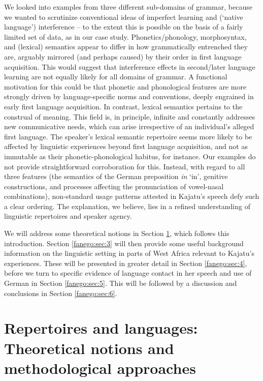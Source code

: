 \documentclass[output=paper]{langscibook}
\begin{document}
We looked into examples from three different sub-domains of grammar, because we wanted to scrutinize conventional ideas of imperfect learning and (‘native language’) interference – to the extent this is possible on the basis of a fairly limited set of data, as in our case study. Phonetics/phonology, morphosyntax, and (lexical) semantics appear to differ in how grammatically entrenched they are, arguably mirrored (and perhaps caused) by their order in first language acquisition. This would suggest that interference effects in second/later language learning are not equally likely for all domains of grammar. A functional motivation for this could be that phonetic and phonological features are more strongly driven by language-specific norms and conventions, deeply engrained in early first language acquisition. In contrast, lexical semantics pertains to the construal of meaning. This field is, in principle, infinite and constantly addresses new communicative needs, which can arise irrespective of an individual’s alleged first language. The speaker’s lexical semantic repertoire seems more likely to be affected by linguistic experiences beyond first language acquisition, and not as immutable as their phonetic-phonological habitus, for instance. Our examples do not provide straightforward corroboration for this. Instead, with regard to all three features (the semantics of the German preposition \textit{in} ‘in’, genitive constructions, and processes affecting the pronunciation of vowel-nasal combinations), non-standard usage patterns attested in Kajatu’s speech defy such a clear ordering. The explanation, we believe, lies in a refined understanding of linguistic repertoires and speaker agency.


We will address some theoretical notions in Section \ref{fanego:sec:2}, which follows this introduction. Section \ref{fanego:sec:3} will then provide some useful background information on the linguistic setting in parts of West Africa relevant to Kajatu’s experiences. These will be presented in greater detail in Section \ref{fanego:sec:4}, before we turn to specific evidence of language contact in her speech and use of German in Section \ref{fanego:sec:5}. This will be followed by a discussion and conclusions in Section \ref{fanego:sec:6}.

\section{Repertoires and languages: Theoretical notions and methodological approaches}\label{fanego:sec:2}
\end{document}
